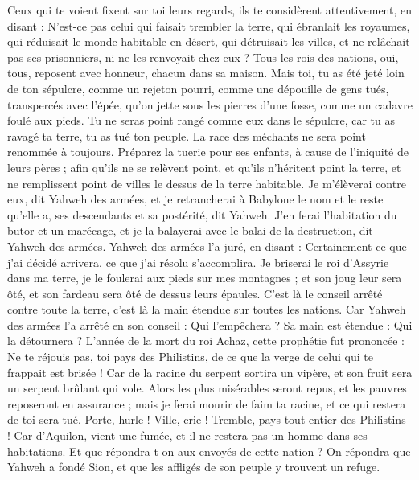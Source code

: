 \begin{multicols}{2}
Ceux qui te voient fixent sur toi leurs regards, ils te considèrent attentivement, en disant : N'est-ce pas celui qui faisait trembler la terre, qui ébranlait les royaumes,
qui réduisait le monde habitable en désert, qui détruisait les villes, et ne relâchait pas ses prisonniers, ni ne les renvoyait chez eux ?
Tous les rois des nations, oui, tous, reposent avec honneur, chacun dans sa maison.
Mais toi, tu as été jeté loin de ton sépulcre, comme un rejeton pourri, comme une dépouille de gens tués, transpercés avec l'épée, qu'on jette sous les pierres d'une fosse, comme un cadavre foulé aux pieds.
Tu ne seras point rangé comme eux dans le sépulcre, car tu as ravagé ta terre, tu as tué ton peuple. La race des méchants ne sera point renommée à toujours.
Préparez la tuerie pour ses enfants, à cause de l'iniquité de leurs pères ; afin qu'ils ne se relèvent point, et qu'ils n'héritent point la terre, et ne remplissent point de villes le dessus de la terre habitable.
Je m'élèverai contre eux, dit Yahweh des armées, et je retrancherai à Babylone le nom et le reste qu'elle a, ses descendants et sa postérité, dit Yahweh.
J'en ferai l'habitation du butor et un marécage, et je la balayerai avec le balai de la destruction, dit Yahweh des armées.
Yahweh des armées l'a juré, en disant : Certainement ce que j'ai décidé arrivera, ce que j'ai résolu s'accomplira.
Je briserai le roi d'Assyrie dans ma terre, je le foulerai aux pieds sur mes montagnes ; et son joug leur sera ôté, et son fardeau sera ôté de dessus leurs épaules.
C'est là le conseil arrêté contre toute la terre, c'est là la main étendue sur toutes les nations.
Car Yahweh des armées l'a arrêté en son conseil : Qui l'empêchera ? Sa main est étendue : Qui la détournera ?
L'année de la mort du roi Achaz, cette prophétie fut prononcée : 
Ne te réjouis pas, toi pays des Philistins, de ce que la verge de celui qui te frappait est brisée ! Car de la racine du serpent sortira un vipère, et son fruit sera un serpent brûlant qui vole.
Alors les plus misérables seront repus, et les pauvres reposeront en assurance ; mais je ferai mourir de faim ta racine, et ce qui restera de toi sera tué.
Porte, hurle ! Ville, crie ! Tremble, pays tout entier des Philistins ! Car d'Aquilon, vient une fumée, et il ne restera pas un homme dans ses habitations.
Et que répondra-t-on aux envoyés de cette nation ? On répondra que Yahweh a fondé Sion, et que les affligés de son peuple y trouvent un refuge.

\end{multicols}
